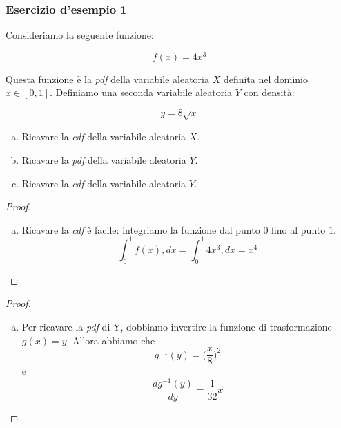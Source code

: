 \documentclass{beamer}
\date[24/05/2022]{24 maggio 2022}
\begin{document}
\frame{\titlepage}

\begin{frame}
	\frametitle{Esercizio d'esempio 1}
	\begin{exercise}[20210524-1]
		Consideriamo la seguente funzione:

		\[
			f(x) = 4 x^3
		\]

		Questa funzione è la \textit{pdf} della variabile aleatoria $X$ definita nel dominio $x \in [0,1]$. Definiamo una seconda variabile aleatoria $Y$ con densità:

		\[
			y = 8 \sqrt{x}
		\]

		\begin{enumerate}[(a)]
			\item Ricavare la \textit{cdf} della variabile aleatoria $X$.
			\item Ricavare la \textit{pdf} della variabile aleatoria $Y$.
			\item Ricavare la \textit{cdf} della variabile aleatoria $Y$.
		\end{enumerate}
	\end{exercise}
\end{frame}

\begin{frame}[fragile]
	\begin{proof}\renewcommand{\qedsymbol}{$\square$}
		\begin{enumerate}[(a)]
			\item Ricavare la \textit{cdf} è facile: integriamo la funzione dal punto $0$ fino al punto $1$.
			      \[
				      \int_0^1 f(x) ,dx = \int_0^1 4x^3 ,dx = x^4
			      \]
		\end{enumerate}
	\end{proof}
\end{frame}

\begin{frame}[fragile]
	\begin{proof}\renewcommand{\qedsymbol}{$\longrightarrow$}
		\begin{enumerate}[(b)]
			\item Per ricavare la \textit{pdf} di Y, dobbiamo invertire la funzione di trasformazione $g(x) = y$. Allora abbiamo che
			      \[
				      g^{-1}(y) = \big(\frac{x}{8}\big)^2
			      \]
			      e
			      \[
				      \frac{dg^{-1}(y)}{dy} = \frac{1}{32} x
			      \]
		\end{enumerate}
	\end{proof}
\end{frame}
\end{document}
